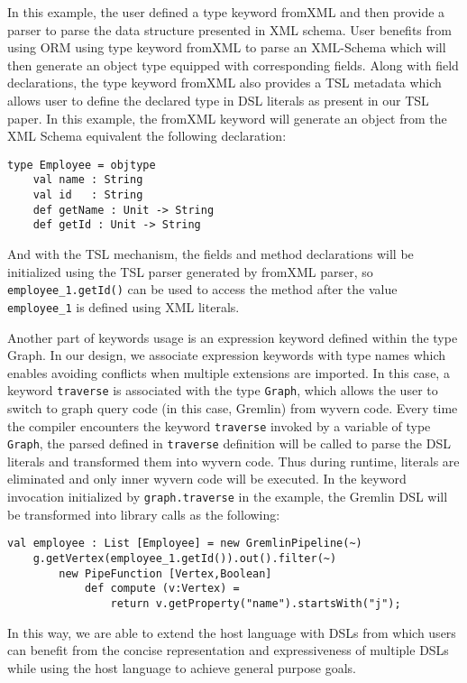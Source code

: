 \documentclass[letterpaper, notitlepage]{article}
\begin{document}
In this example, the user defined a type keyword fromXML and then provide a parser to parse the data structure presented in XML schema. User benefits from using ORM using type keyword fromXML to parse an XML-Schema which will then generate an object type equipped with corresponding fields. Along with field declarations, the type keyword fromXML also provides a TSL metadata which allows user to define the declared type in DSL literals as present in our TSL paper. In this example, the fromXML keyword will generate an object from the XML Schema equivalent the following declaration:
\begin{lstlisting}[style=wyvern]
type Employee = objtype
	val name : String
	val id   : String
	def getName : Unit -> String
	def getId : Unit -> String
\end{lstlisting}
And with the TSL mechanism, the fields and method declarations will be initialized using the TSL parser generated by fromXML parser, so \texttt{employee\_1.getId()} can be used to access the method after the value \texttt{employee\_1} is defined using XML literals.
\par
Another part of keywords usage is an expression keyword defined within the type Graph. In our design, we associate expression keywords with type names which enables avoiding conflicts when multiple extensions are imported. In this case, a keyword \texttt{traverse} is associated with the type \texttt{Graph}, which allows the user to switch to graph query code (in this case, Gremlin) from wyvern code. Every time the compiler encounters the keyword \texttt{traverse} invoked by a variable of type \texttt{Graph}, the parsed defined in \texttt{traverse} definition will be called to parse the DSL literals and transformed them into wyvern code. Thus during runtime, literals are eliminated and only inner wyvern code will be executed. In the keyword invocation initialized by \texttt{graph.traverse} in the example, the Gremlin DSL will be transformed into library calls as the following:
\begin{lstlisting}[style=wyvern]
val employee : List [Employee] = new GremlinPipeline(~)
	g.getVertex(employee_1.getId()).out().filter(~)
		new PipeFunction [Vertex,Boolean] 
   			def compute (v:Vertex) =
    			return v.getProperty("name").startsWith("j");
\end{lstlisting}
In this way, we are able to extend the host language with DSLs from which users can benefit from the concise representation and expressiveness of multiple DSLs while using the host language to achieve general purpose goals.
\end{document}
